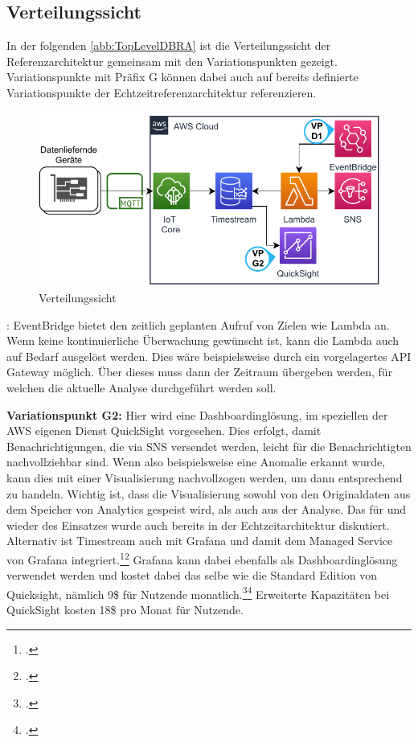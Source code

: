 \subsection{Verteilungssicht}
In der folgenden \autoref{abb:TopLevelDBRA} ist die Verteilungssicht der Referenzarchitektur gemeinsam mit den Variationspunkten gezeigt. Variationspunkte mit Präfix G können dabei auch auf bereits definierte Variationspunkte der Echtzeitreferenzarchitektur referenzieren.
\begin{figure}[H]
\centering
\includegraphics[width=\textwidth]{graphics/DB-RA-Overview.pdf}
\caption{Verteilungssicht}
\label{abb:TopLevelDBRA}
\end{figure}

: EventBridge bietet den zeitlich geplanten Aufruf von Zielen wie Lambda an. Wenn keine kontinuierliche Überwachung gewünscht ist, kann die Lambda auch auf Bedarf ausgelöst werden. Dies wäre beispielsweise durch ein vorgelagertes API Gateway möglich. Über dieses muss dann der Zeitraum übergeben werden, für welchen die aktuelle Analyse durchgeführt werden soll.

\textbf{Variationspunkt G2:} Hier wird eine Dashboardinglösung, im speziellen der \ac{AWS} eigenen Dienst QuickSight vorgesehen. Dies erfolgt, damit Benachrichtigungen, die via \ac{SNS} versendet werden, leicht für die Benachrichtigten nachvollziehbar sind. Wenn also beispielsweise eine Anomalie erkannt wurde, kann dies mit einer Visualisierung nachvollzogen werden, um dann entsprechend zu handeln. Wichtig ist, dass die Visualisierung sowohl von den Originaldaten aus dem Speicher von \AWSIOT{} Analytics gespeist wird, als auch aus der Analyse. Das für und wieder des Einsatzes wurde auch bereits in  der Echtzeitarchitektur diskutiert. Alternativ ist Timestream auch mit Grafana und damit dem Managed Service von Grafana integriert.\footcite[Vgl.][]{AmazonWebServicesInc..o.J.bm}\nzitat\footcite[Vgl.][]{Dutt.2020} Grafana kann dabei ebenfalls als Dashboardinglösung verwendet werden und kostet dabei das selbe wie die Standard Edition von Quicksight, nämlich 9\$ für Nutzende monatlich.\footcite[Vgl. auch im Foglenden][]{AmazonWebServicesInc..o.J.bn}\nzitat\footcite[Vgl.][]{AmazonWebServicesInc..o.J.bo} Erweiterte Kapazitäten bei QuickSight kosten 18\$ pro Monat für Nutzende. 



